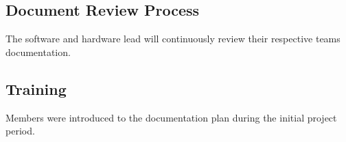 \subsection{Document Review Process}

The software and hardware lead will continuously review their respective teams documentation.



\subsection{Training}

Members were introduced to the documentation plan during the initial project period.



